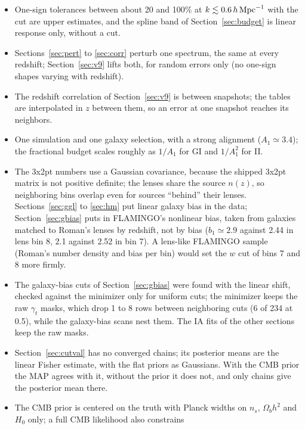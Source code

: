 \documentclass[11pt]{article}
\newcommand{\hMpc}{\,h\,{\rm Mpc}^{-1}}
\begin{document}
\begin{itemize}
  \item One-sign tolerances between about 20 and 100\% at $k \lesssim
    0.6\hMpc$ with the cut are upper estimates, and the spline band of
    Section~\ref{sec:budget} is linear response only, without a cut.
  \item Sections~\ref{sec:pert} to \ref{sec:corr} perturb one spectrum,
    the same at every redshift; Section~\ref{sec:v9} lifts both, for
    random errors only (no one-sign shapes varying with redshift).
  \item The redshift correlation of Section~\ref{sec:v9} is between
    snapshots; the tables are interpolated in $z$ between them, so an
    error at one snapshot reaches its neighbors.
  \item One simulation and one galaxy selection, with a strong alignment
    ($A_1 \simeq 3.4$); the fractional budget scales roughly as $1/A_1$ for
    GI and $1/A_1^2$ for II.
  \item The 3x2pt numbers use a Gaussian covariance, because the shipped
    3x2pt matrix is not positive definite; the lenses share the source
    $n(z)$, so neighboring bins overlap even for sources ``behind'' their
    lenses. Sections~\ref{sec:ggl} to \ref{sec:hm} put linear galaxy bias
    in the data; Section~\ref{sec:gbias} puts in FLAMINGO's nonlinear bias,
    taken from galaxies matched to Roman's lenses by redshift, not by bias
    ($b_1 \simeq 2.9$ against 2.44 in lens bin 8, 2.1 against 2.52 in bin
    7). A lens-like FLAMINGO sample (Roman's number density and bias per bin)
    would set the $w$ cut of bins 7 and 8 more firmly.
  \item The galaxy-bias cuts of Section~\ref{sec:gbias} were found with the
    linear shift, checked against the minimizer only for uniform cuts; the
    minimizer keeps the raw $\gamma_t$ masks, which drop 1 to 8 rows
    between neighboring cuts (6 of 234 at 0.5), while the galaxy-bias scans
    nest them. The IA fits of the other sections keep the raw masks.
  \item Section~\ref{sec:cutval} has no converged chains; its posterior
    means are the linear Fisher estimate, with the flat priors as
    Gaussians. With the CMB prior the MAP agrees with it, without the prior
    it does not, and only chains give the posterior mean there.
  \item The CMB prior is centered on the truth with Planck widths on $n_s$,
    $\Omega_b h^2$ and $H_0$ only; a full CMB likelihood also constrains

\end{itemize}
\end{document}

